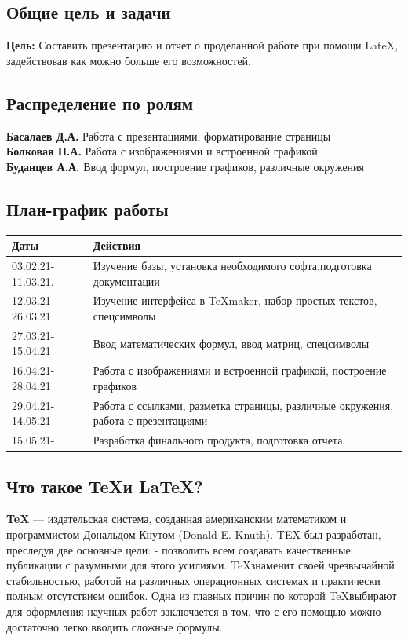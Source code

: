 \documentclass[14pt, a4paper]{extarticle}
\begin{document}
\subsection{Общие цель и задачи}
\textbf{Цель:} Составить презентацию и отчет о проделанной работе при помощи LateX, задействовав как можно больше его возможностей.
\subsection{Распределение по ролям}
\textbf{Басалаев Д.А.} Работа с презентациями, форматирование страницы\\
\textbf{Болковая П.А.} Работа с изображениями и встроенной графикой\\
\textbf{Буданцев А.А.} Ввод формул, построение графиков, различные окружения
\subsection{План-график работы}
\begin{tabular}{| l| p{13cm}|}
\hline {\bfseries \large Даты} & {\bfseries \large Действия}\\ \hline
03.02.21-11.03.21. & Изучение базы, установка необходимого софта,подготовка документации\\ \hline
12.03.21-26.03.21 & Изучение интерфейса в \TeX maker, набор простых текстов, спецсимволы \\ \hline
27.03.21-15.04.21 & Ввод математических формул, ввод матриц, спецсимволы  \\ \hline
16.04.21-28.04.21 & Работа с изображениями и встроенной графикой, построение графиков \\ \hline 
29.04.21-14.05.21 & Работа с ссылками, разметка страницы, различные окружения, работа с презентациями \\ \hline
15.05.21- & Разработка финального продукта, подготовка отчета. \\ \hline
\end{tabular}
\subsection{Что такое \TeX и \LaTeX ?}
\textbf{\TeX} — издательская система, созданная американским математиком и программистом Дональдом Кнутом (Donald E. Knuth). TEX был разработан, преследуя две основные цели: - позволить всем создавать качественные публикации с разумными для этого усилиями. \TeX знаменит своей чрезвычайной стабильностью, работой на различных операционных системах и практически полным отсутствием ошибок. Одна из главных причин по которой \TeX выбирают для оформления научных работ заключается в том, что с его помощью можно достаточно легко вводить сложные формулы.\\
\end{document}
